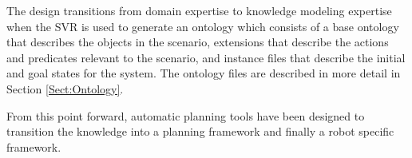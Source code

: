 The design transitions from domain expertise to knowledge modeling expertise
when the SVR is used to generate an ontology which consists of a base ontology
that describes the objects in the scenario, extensions that describe the
actions and predicates relevant to the scenario, and instance files that
describe the initial and goal states for the system. The ontology files are
described in more detail in Section \ref{Sect:Ontology}.

From this point forward, automatic planning tools have been designed to transition 
the knowledge into a planning framework and finally a robot specific framework.

